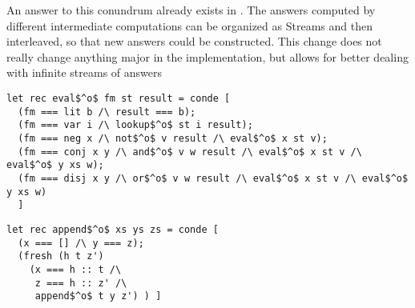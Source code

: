 An answer to this conundrum already exists in \mk.
The answers computed by different intermediate computations can be organized as Streams and then interleaved, so that new answers could be constructed.
This change does not really change anything major in the implementation, but allows for better dealing with infinite streams of answers

\begin{figure*}[!t]
  \centering
  \begin{minipage}{\textwidth}
    \begin{lstlisting}[label={eval}, caption={A simple evaluator relation}, captionpos=b, frame=tb]
let rec eval$^o$ fm st result = conde [
  (fm === lit b /\ result === b);
  (fm === var i /\ lookup$^o$ st i result);
  (fm === neg x /\ not$^o$ v result /\ eval$^o$ x st v);
  (fm === conj x y /\ and$^o$ v w result /\ eval$^o$ x st v /\ eval$^o$ y xs w);
  (fm === disj x y /\ or$^o$ v w result /\ eval$^o$ x st v /\ eval$^o$ y xs w)
  ]
    \end{lstlisting}
  \end{minipage}
\end{figure*}








\begin{figure*}[!t]
  \centering
  \begin{minipage}{0.38\textwidth}
    \begin{lstlisting}[label={append}, caption={List concatenation relation}, captionpos=b, frame=tb]
let rec append$^o$ xs ys zs = conde [
  (x === [] /\ y === z);
  (fresh (h t z')
    (x === h :: t /\
     z === h :: z' /\
     append$^o$ t y z') ) ]
    \end{lstlisting}
  \end{minipage}
\end{figure*}







